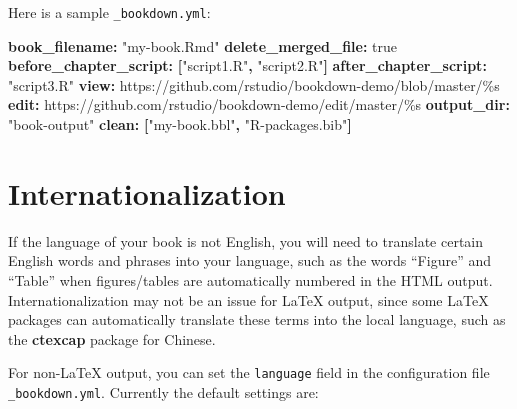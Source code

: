 \documentclass[
  12pt,
]{krantz}
\newenvironment{Shaded}{\begin{snugshade}}{\end{snugshade}}
\newcommand{\AttributeTok}[1]{\textcolor[rgb]{0.13,0.29,0.53}{#1}}
\newcommand{\CharTok}[1]{\textcolor[rgb]{0.31,0.60,0.02}{#1}}
\newcommand{\FunctionTok}[1]{\textcolor[rgb]{0.13,0.29,0.53}{\textbf{#1}}}
\newcommand{\KeywordTok}[1]{\textcolor[rgb]{0.13,0.29,0.53}{\textbf{#1}}}
\newcommand{\StringTok}[1]{\textcolor[rgb]{0.31,0.60,0.02}{#1}}
\begin{document}
Here is a sample \texttt{\_bookdown.yml}:

\begin{Shaded}
\begin{Highlighting}[]
\FunctionTok{book\_filename}\KeywordTok{:}\AttributeTok{ }\StringTok{"my{-}book.Rmd"}
\FunctionTok{delete\_merged\_file}\KeywordTok{:}\AttributeTok{ }\CharTok{true}
\FunctionTok{before\_chapter\_script}\KeywordTok{:}\AttributeTok{ }\KeywordTok{[}\StringTok{"script1.R"}\KeywordTok{,}\AttributeTok{ }\StringTok{"script2.R"}\KeywordTok{]}
\FunctionTok{after\_chapter\_script}\KeywordTok{:}\AttributeTok{ }\StringTok{"script3.R"}
\FunctionTok{view}\KeywordTok{:}\AttributeTok{ https://github.com/rstudio/bookdown{-}demo/blob/master/\%s}
\FunctionTok{edit}\KeywordTok{:}\AttributeTok{ https://github.com/rstudio/bookdown{-}demo/edit/master/\%s}
\FunctionTok{output\_dir}\KeywordTok{:}\AttributeTok{ }\StringTok{"book{-}output"}
\FunctionTok{clean}\KeywordTok{:}\AttributeTok{ }\KeywordTok{[}\StringTok{"my{-}book.bbl"}\KeywordTok{,}\AttributeTok{ }\StringTok{"R{-}packages.bib"}\KeywordTok{]}
\end{Highlighting}
\end{Shaded}

\hypertarget{internationalization}{%
\section{Internationalization}\label{internationalization}}

If the language of your book is not English, you will need to translate certain English words and phrases into your language, such as the words ``Figure'' and ``Table'' when figures/tables are automatically numbered in the HTML output. Internationalization may not be an issue for LaTeX output, since some LaTeX packages can automatically translate these terms into the local language, such as the \textbf{ctexcap} package for Chinese.

For non-LaTeX output, you can set the \texttt{language} field in the configuration file \texttt{\_bookdown.yml}. Currently the default settings are:
\end{document}
